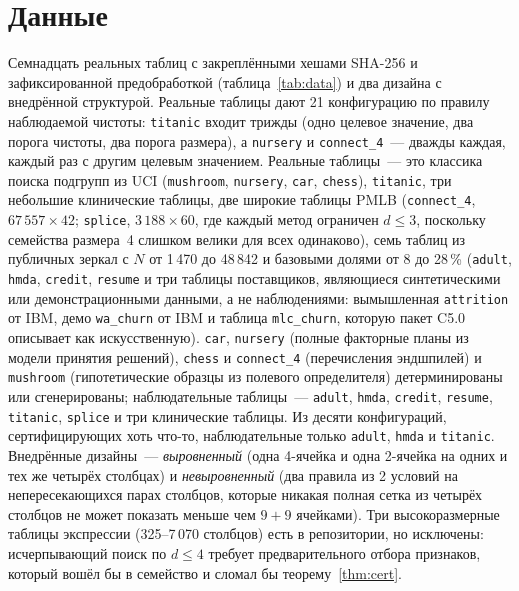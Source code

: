 \documentclass[11pt]{article}
\begin{document}
\section{Данные}\label{sec:data}
Семнадцать реальных таблиц с закреплёнными хешами SHA-256 и зафиксированной предобработкой (таблица~\ref{tab:data}) и два дизайна с внедрённой структурой. Реальные таблицы дают 21 конфигурацию по правилу наблюдаемой чистоты: \texttt{titanic} входит трижды (одно целевое значение, два порога чистоты, два порога размера), а \texttt{nursery} и \texttt{connect\_4}~--- дважды каждая, каждый раз с другим целевым значением. Реальные таблицы~--- это классика поиска подгрупп из UCI (\texttt{mushroom}, \texttt{nursery}, \texttt{car}, \texttt{chess}), \texttt{titanic}, три небольшие клинические таблицы, две широкие таблицы PMLB (\texttt{connect\_4}, $67\,557\times42$; \texttt{splice}, $3\,188\times60$, где каждый метод ограничен $d\le3$, поскольку семейства размера~4 слишком велики для всех одинаково), семь таблиц из публичных зеркал с $N$ от 1\,470 до 48\,842 и базовыми долями от 8 до 28\,\% (\texttt{adult}, \texttt{hmda}, \texttt{credit}, \texttt{resume} и три таблицы поставщиков, являющиеся синтетическими или демонстрационными данными, а не наблюдениями: вымышленная \texttt{attrition} от IBM, демо \texttt{wa\_churn} от IBM и таблица \texttt{mlc\_churn}, которую пакет C5.0 описывает как искусственную). \texttt{car}, \texttt{nursery} (полные факторные планы из модели принятия решений), \texttt{chess} и \texttt{connect\_4} (перечисления эндшпилей) и \texttt{mushroom} (гипотетические образцы из полевого определителя) детерминированы или сгенерированы; наблюдательные таблицы~--- \texttt{adult}, \texttt{hmda}, \texttt{credit}, \texttt{resume}, \texttt{titanic}, \texttt{splice} и три клинические таблицы. Из десяти конфигураций, сертифицирующих хоть что-то, наблюдательные только \texttt{adult}, \texttt{hmda} и \texttt{titanic}. Внедрённые дизайны~--- \emph{выровненный} (одна 4-ячейка и одна 2-ячейка на одних и тех же четырёх столбцах) и \emph{невыровненный} (два правила из 2 условий на непересекающихся парах столбцов, которые никакая полная сетка из четырёх столбцов не может показать меньше чем $9+9$ ячейками). Три высокоразмерные таблицы экспрессии (325--7\,070 столбцов) есть в репозитории, но исключены: исчерпывающий поиск по $d\le4$ требует предварительного отбора признаков, который вошёл бы в семейство и сломал бы теорему~\ref{thm:cert}.

\begin{table}[t]\centering\footnotesize\setlength{\tabcolsep}{4pt}
\caption{Наборы данных и настройки, по строке на целевое значение (получено \texttt{experiments/paper\_tables.py} из манифеста и списка конфигураций). $\tau/\text{база}$~--- наименьшее отношение порога чистоты к базовой доле этого целевого значения.}\label{tab:data}

\end{table}
\end{document}
